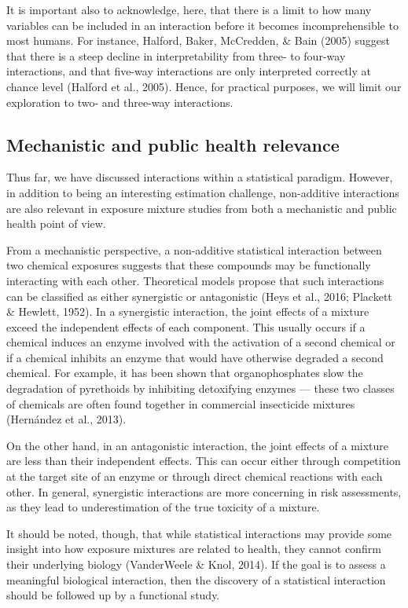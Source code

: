 \documentclass[12pt, twoside]{amherstthesis}
\begin{document}
It is important also to acknowledge, here, that there is a limit to how many variables can be included in an interaction before it becomes incomprehensible to most humans. For instance, Halford, Baker, McCredden, \& Bain (2005) suggest that there is a steep decline in interpretability from three- to four-way interactions, and that five-way interactions are only interpreted correctly at chance level (Halford et al., 2005). Hence, for practical purposes, we will limit our exploration to two- and three-way interactions.

\hypertarget{mechanistic-and-public-health-relevance}{%
\subsection{Mechanistic and public health relevance}\label{mechanistic-and-public-health-relevance}}

Thus far, we have discussed interactions within a statistical paradigm. However, in addition to being an interesting estimation challenge, non-additive interactions are also relevant in exposure mixture studies from both a mechanistic and public health point of view.

From a mechanistic perspective, a non-additive statistical interaction between two chemical exposures suggests that these compounds may be functionally interacting with each other. Theoretical models propose that such interactions can be classified as either synergistic or antagonistic (Heys et al., 2016; Plackett \& Hewlett, 1952). In a synergistic interaction, the joint effects of a mixture exceed the independent effects of each component. This usually occurs if a chemical induces an enzyme involved with the activation of a second chemical or if a chemical inhibits an enzyme that would have otherwise degraded a second chemical. For example, it has been shown that organophosphates slow the degradation of pyrethoids by inhibiting detoxifying enzymes --- these two classes of chemicals are often found together in commercial insecticide mixtures (Hernández et al., 2013).

On the other hand, in an antagonistic interaction, the joint effects of a mixture are less than their independent effects. This can occur either through competition at the target site of an enzyme or through direct chemical reactions with each other. In general, synergistic interactions are more concerning in risk assessments, as they lead to underestimation of the true toxicity of a mixture.

It should be noted, though, that while statistical interactions may provide some insight into how exposure mixtures are related to health, they cannot confirm their underlying biology (VanderWeele \& Knol, 2014). If the goal is to assess a meaningful biological interaction, then the discovery of a statistical interaction should be followed up by a functional study.
\end{document}
